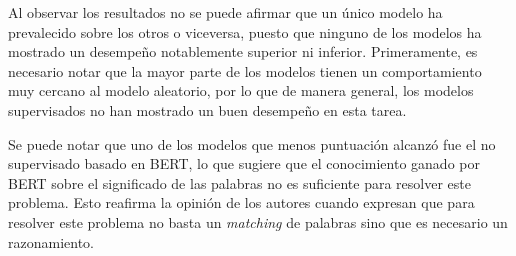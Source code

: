 Al observar los resultados no se puede afirmar que un único modelo ha prevalecido sobre los otros o viceversa, puesto que ninguno de los modelos ha mostrado un desempeño notablemente superior ni inferior. Primeramente, es necesario notar que la mayor parte de los modelos tienen un comportamiento muy cercano al modelo aleatorio, por lo que de manera general, los modelos supervisados no han mostrado un buen desempeño en esta tarea.

Se puede notar que uno de los modelos que menos puntuación alcanzó fue el no supervisado basado en BERT, lo que sugiere que el conocimiento ganado por BERT sobre el significado de las palabras no es suficiente para resolver este problema. Esto reafirma la opinión de los autores cuando expresan que para resolver este problema no basta un \textit{matching} de palabras sino que es necesario un razonamiento.


